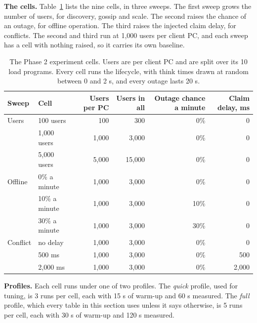 \textbf{The cells.} Table~\ref{tab:cells} lists the nine cells, in three sweeps. The first sweep grows the number of users, for discovery, gossip and scale. The second raises the chance of an outage, for offline operation. The third raises the injected claim delay, for conflicts. The second and third run at 1,000 users per client PC, and each sweep has a cell with nothing raised, so it carries its own baseline.

\begin{table}[!htb]
\centering\small
\caption{The Phase 2 experiment cells. Users are per client PC and are split over its 10 load programs. Every cell runs the lifecycle, with think times drawn at random between 0 and 2 s, and every outage lasts 20 s.}
\label{tab:cells}
\begin{tabular}{@{}llrrrr@{}}
\toprule
Sweep & Cell & Users per PC & Users in all & Outage chance a minute & Claim delay, ms \\
\midrule
Users & 100 users & 100 & 300 & 0\% & 0 \\
 & 1,000 users & 1,000 & 3,000 & 0\% & 0 \\
 & 5,000 users & 5,000 & 15,000 & 0\% & 0 \\
\midrule
Offline & 0\% a minute & 1,000 & 3,000 & 0\% & 0 \\
 & 10\% a minute & 1,000 & 3,000 & 10\% & 0 \\
 & 30\% a minute & 1,000 & 3,000 & 30\% & 0 \\
\midrule
Conflict & no delay & 1,000 & 3,000 & 0\% & 0 \\
 & 500 ms & 1,000 & 3,000 & 0\% & 500 \\
 & 2,000 ms & 1,000 & 3,000 & 0\% & 2,000 \\
\bottomrule
\end{tabular}
\end{table}

\textbf{Profiles.} Each cell runs under one of two profiles. The \emph{quick} profile, used for tuning, is 3 runs per cell, each with 15 s of warm-up and 60 s measured. The \emph{full} profile, which every table in this section uses unless it says otherwise, is 5 runs per cell, each with 30 s of warm-up and 120 s measured.

